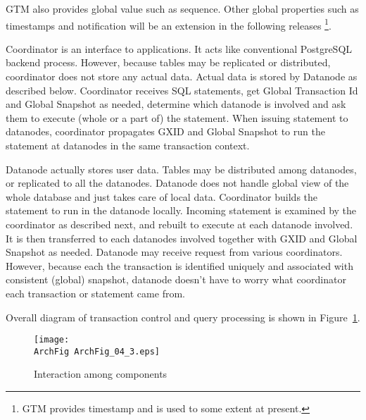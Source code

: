   GTM also provides global value such as sequence.
  Other global properties such as timestamps and notification will be an extension
  in the following releases%
  \footnote{
	  GTM provides timestamp and is used to some extent at present.
  }.




  Coordinator is an interface to applications.
  It acts like conventional PostgreSQL backend process.
  However, because tables may be replicated or distributed, coordinator does not store
  any actual data.
  Actual data is stored by Datanode as described below.
  Coordinator receives SQL statements, get Global Transaction Id and Global Snapshot as needed,
  determine which datanode is involved and ask them to execute (whole or a part of) the statement.
  When issuing statement to datanodes,
  coordinator propagates GXID and Global Snapshot to run the statement at datanodes in the same
  transaction context.




  Datanode actually stores user data.
  Tables may be distributed among datanodes, or replicated to all the datanodes.
  Datanode does not handle global view of the whole database and just takes
  care of local data.
  Coordinator builds the statement to run in the datanode locally.
  Incoming statement is examined by the coordinator as described next, and rebuilt
  to execute at each datanode involved.
  It is then transferred to each datanodes involved together with GXID and Global
  Snapshot as needed.
  Datanode may receive request from various coordinators.
  However, because each the transaction is identified uniquely and associated with
  consistent (global) snapshot, datanode doesn't have to worry what coordinator
  each transaction or statement came from.
  
  Overall diagram of transaction control and query processing is shown in Figure~\ref{archfig:9}.
  
  \begin{figure}[htp]
	  \begin{center}
		  \texttt{[image: \\ArchFig ArchFig\_04\_3.eps]}
		  \caption{\label{archfig:9}Interaction among \XC{} components}
	  \end{center}
  \end{figure}
  

